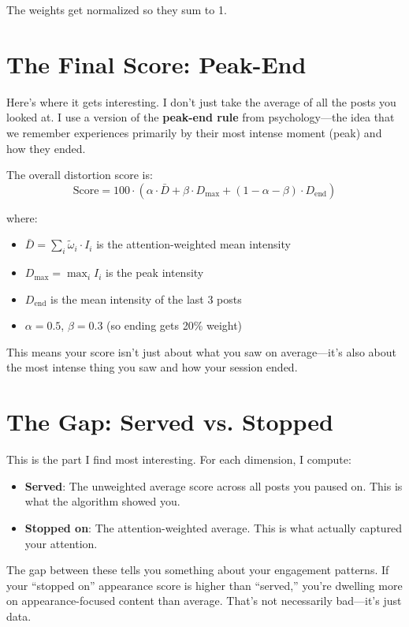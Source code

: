 \documentclass[11pt]{article}
\begin{document}
The weights get normalized so they sum to 1.

\section{The Final Score: Peak-End}

Here's where it gets interesting. I don't just take the average of all the posts you looked at. I use a version of the \textbf{peak-end rule} from psychology—the idea that we remember experiences primarily by their most intense moment (peak) and how they ended.

The overall distortion score is:
\[
\text{Score} = 100 \cdot \left( \alpha \cdot \bar{D} + \beta \cdot D_{\max} + (1 - \alpha - \beta) \cdot D_{\text{end}} \right)
\]

where:
\begin{itemize}
    \item $\bar{D} = \sum_i \tilde{\omega}_i \cdot I_i$ is the attention-weighted mean intensity
    \item $D_{\max} = \max_i I_i$ is the peak intensity
    \item $D_{\text{end}}$ is the mean intensity of the last 3 posts
    \item $\alpha = 0.5$, $\beta = 0.3$ (so ending gets 20\% weight)
\end{itemize}

This means your score isn't just about what you saw on average—it's also about the most intense thing you saw and how your session ended.

\section{The Gap: Served vs. Stopped}

This is the part I find most interesting. For each dimension, I compute:
\begin{itemize}
    \item \textbf{Served}: The unweighted average score across all posts you paused on. This is what the algorithm showed you.
    \item \textbf{Stopped on}: The attention-weighted average. This is what actually captured your attention.
\end{itemize}

The gap between these tells you something about your engagement patterns. If your ``stopped on'' appearance score is higher than ``served,'' you're dwelling more on appearance-focused content than average. That's not necessarily bad—it's just data.
\end{document}
